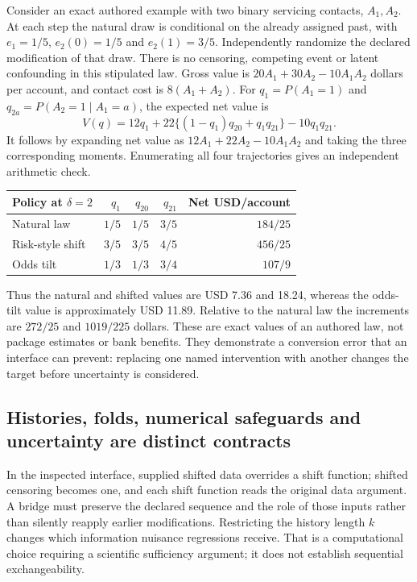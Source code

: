 Consider an exact authored example with two binary servicing contacts,
$A_1,A_2$. At each step the natural draw is conditional on the already assigned
past, with $e_1=1/5$, $e_2(0)=1/5$ and $e_2(1)=3/5$. Independently randomize
the declared modification of that draw. There is no censoring, competing event
or latent confounding in this stipulated law. Gross value is
$20A_1+30A_2-10A_1A_2$ dollars per account, and contact cost is
$8(A_1+A_2)$. For $q_1=P(A_1=1)$ and $q_{2a}=P(A_2=1\mid A_1=a)$,
the expected net value is
\begin{equation}
 V(q)=12q_1+22\{(1-q_1)q_{20}+q_1q_{21}\}-10q_1q_{21}.
 \label{exec23:lmtp-value}
\end{equation}
It follows by expanding net value as $12A_1+22A_2-10A_1A_2$ and taking
the three corresponding moments. Enumerating all four trajectories gives an
independent arithmetic check.~\citep{exec23_policy_reference}

\begin{center}
\begin{tabular}{lrrrr}
\hline
Policy at $\delta=2$ & $q_1$ & $q_{20}$ & $q_{21}$ & Net USD/account\\
\hline
Natural law & $1/5$ & $1/5$ & $3/5$ & $184/25$\\
Risk-style shift & $3/5$ & $3/5$ & $4/5$ & $456/25$\\
Odds tilt & $1/3$ & $1/3$ & $3/4$ & $107/9$\\
\hline
\end{tabular}
\end{center}

Thus the natural and shifted values are USD 7.36 and 18.24, whereas the
odds-tilt value is approximately USD 11.89. Relative to the natural law the
increments are $272/25$ and $1019/225$ dollars. These are exact values of an
authored law, not package estimates or bank benefits. They demonstrate a
conversion error that an interface can prevent: replacing one named
intervention with another changes the target before uncertainty is considered.

\subsection{Histories, folds, numerical safeguards and uncertainty are distinct contracts}
\label{exec23:lmtp-conversion}

In the inspected interface, supplied shifted data overrides a shift function;
shifted censoring becomes one, and each shift function reads the original data
argument. A bridge must preserve the declared sequence and the role of those
inputs rather than silently reapply earlier modifications. Restricting the
history length $k$ changes which information nuisance regressions receive.
That is a computational choice requiring a scientific sufficiency argument;
it does not establish sequential exchangeability.
\citep{exec22_lmtp_reuse}

